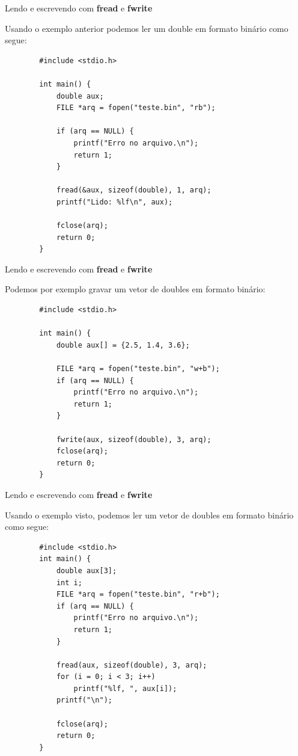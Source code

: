 \documentclass[handout]{beamer}
\begin{document}
\begin{frame}[fragile]{Lendo e escrevendo com \textbf{fread} e \textbf{fwrite}}

    Usando o exemplo anterior podemos  ler um double em formato binário como segue:
    \begin{verbatim}
        #include <stdio.h>

        int main() {
            double aux;
            FILE *arq = fopen("teste.bin", "rb");

            if (arq == NULL) {
                printf("Erro no arquivo.\n");
                return 1;
            }

            fread(&aux, sizeof(double), 1, arq);
            printf("Lido: %lf\n", aux);

            fclose(arq);
            return 0;
        }
    \end{verbatim}

\end{frame}

\begin{frame}[fragile]{Lendo e escrevendo com \textbf{fread} e \textbf{fwrite}}

    Podemos por exemplo gravar um vetor de doubles em formato binário:
    \begin{verbatim}
        #include <stdio.h>

        int main() {
            double aux[] = {2.5, 1.4, 3.6};

            FILE *arq = fopen("teste.bin", "w+b");
            if (arq == NULL) {
                printf("Erro no arquivo.\n");
                return 1;
            }

            fwrite(aux, sizeof(double), 3, arq);
            fclose(arq);
            return 0;
        }
    \end{verbatim}

\end{frame}

\begin{frame}[fragile]{Lendo e escrevendo com \textbf{fread} e \textbf{fwrite}}

    Usando o exemplo visto, podemos ler um vetor de doubles em formato binário como segue:
    \vspace{-1em}
    \begin{verbatim}
        #include <stdio.h>
        int main() {
            double aux[3];
            int i;
            FILE *arq = fopen("teste.bin", "r+b");
            if (arq == NULL) {
                printf("Erro no arquivo.\n");
                return 1;
            }

            fread(aux, sizeof(double), 3, arq);
            for (i = 0; i < 3; i++)
                printf("%lf, ", aux[i]);
            printf("\n");

            fclose(arq);
            return 0;
        }
    \end{verbatim}

\end{frame}
\end{document}
